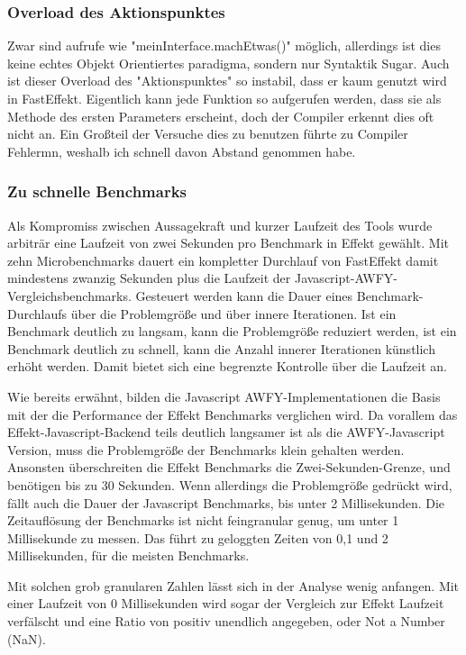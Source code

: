 \subsubsection{ Overload des Aktionspunktes }
Zwar sind aufrufe wie "meinInterface.machEtwas()" möglich, allerdings ist dies keine echtes Objekt Orientiertes paradigma, sondern nur Syntaktik Sugar.
Auch ist dieser Overload des "Aktionspunktes" so instabil, dass er kaum genutzt wird in FastEffekt. Eigentlich kann jede Funktion so aufgerufen werden, dass sie als Methode des ersten Parameters erscheint, 
doch der Compiler erkennt dies oft nicht an. Ein Großteil der Versuche dies zu benutzen führte zu Compiler Fehlermn, weshalb ich schnell davon Abstand genommen habe.

\subsubsection{ Zu schnelle Benchmarks }
Als Kompromiss zwischen Aussagekraft und kurzer Laufzeit des Tools wurde arbiträr eine Laufzeit von zwei Sekunden pro Benchmark in Effekt gewählt.
Mit zehn Microbenchmarks dauert ein kompletter Durchlauf von FastEffekt damit mindestens zwanzig Sekunden plus die Laufzeit der Javascript-AWFY-Vergleichsbenchmarks.
Gesteuert werden kann die Dauer eines Benchmark-Durchlaufs über die Problemgröße und über innere Iterationen. Ist ein Benchmark deutlich zu langsam, kann die Problemgröße reduziert werden, ist ein Benchmark deutlich zu schnell, kann die Anzahl innerer Iterationen künstlich erhöht werden. Damit bietet sich eine begrenzte Kontrolle über die Laufzeit an.

Wie bereits erwähnt, bilden die Javascript AWFY-Implementationen die Basis mit der die Performance der Effekt Benchmarks verglichen wird.
Da vorallem das Effekt-Javascript-Backend teils deutlich langsamer ist als die AWFY-Javascript Version, muss die Problemgröße der Benchmarks klein gehalten werden. Ansonsten überschreiten die Effekt Benchmarks die Zwei-Sekunden-Grenze, und benötigen bis zu 30 Sekunden. Wenn allerdings die Problemgröße gedrückt wird, fällt auch die Dauer der Javascript Benchmarks, bis unter 2 Millisekunden. Die Zeitauflösung der Benchmarks ist nicht feingranular genug, um unter 1 Millisekunde zu messen. Das führt zu geloggten Zeiten von 0,1 und 2 Millisekunden, für die meisten Benchmarks. 

Mit solchen grob granularen Zahlen lässt sich in der Analyse wenig anfangen. Mit einer Laufzeit von 0 Millisekunden wird sogar der Vergleich zur Effekt Laufzeit verfälscht und eine Ratio von positiv unendlich angegeben, oder Not a Number (NaN).

